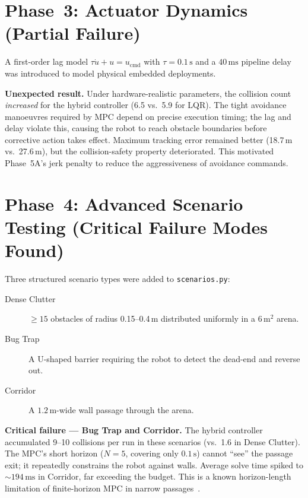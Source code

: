 \documentclass[12pt,a4paper,oneside]{report}
\begin{document}
\section{Phase~3: Actuator Dynamics (Partial Failure)}

A first-order lag model \(\tau\dot{u}+u=u_{\mathrm{cmd}}\) with
\(\tau=0.1\,\text{s}\) and a \(40\,\text{ms}\) pipeline delay was
introduced to model physical embedded deployments.

\begin{warnbox}
  \textbf{Unexpected result.} Under hardware-realistic parameters, the
  collision count \textit{increased} for the hybrid controller (6.5 vs.\
  5.9 for LQR). The tight avoidance manoeuvres required by MPC depend on
  precise execution timing; the lag and delay violate this, causing the
  robot to reach obstacle boundaries before corrective action takes effect.
  Maximum tracking error remained better (18.7\,m vs.\ 27.6\,m), but the
  collision-safety property deteriorated. This motivated Phase~5A's jerk
  penalty to reduce the aggressiveness of avoidance commands.
\end{warnbox}

\section{Phase~4: Advanced Scenario Testing (Critical Failure Modes Found)}

Three structured scenario types were added to \texttt{scenarios.py}:
\begin{description}
  \item[Dense Clutter] $\geq\!15$ obstacles of radius 0.15--0.4\,m
    distributed uniformly in a $6\,\text{m}^2$ arena.
  \item[Bug Trap] A U-shaped barrier requiring the robot to detect the
    dead-end and reverse out.
  \item[Corridor] A $1.2\,\text{m}$-wide wall passage through the arena.
\end{description}

\begin{warnbox}
  \textbf{Critical failure — Bug Trap and Corridor.}
  The hybrid controller accumulated 9--10 collisions per run in these
  scenarios (vs.\ 1.6 in Dense Clutter). The MPC's short horizon (\(N=5\),
  covering only \(0.1\,\text{s}\)) cannot ``see'' the passage exit; it
  repeatedly constrains the robot against walls. Average solve time spiked
  to \(\sim\!194\,\text{ms}\) in Corridor, far exceeding the budget.
  This is a known horizon-length limitation of finite-horizon MPC in
  narrow passages~\cite{rawlings2017}.
\end{warnbox}
\end{document}
